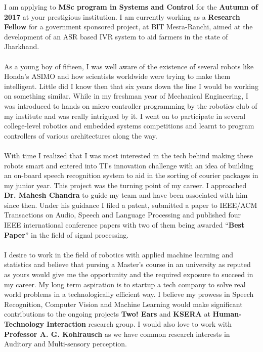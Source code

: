 \documentclass[11pt, a4paper]{awesome-cv}
\begin{document}
\makecvheader

\makelettertitle

\begin{cvletter}
I am applying to \textbf{MSc program in Systems and Control} for the \textbf{Autumn of 2017} at your prestigious institution. I am currently working as a \textbf{Research Fellow} for a government sponsored project, at BIT Mesra-Ranchi, aimed at the development of an ASR based IVR system to aid farmers in the state of Jharkhand.\\ \\
As a young boy of fifteen, I was well aware of the existence of several robots like Honda's ASIMO and how scientists worldwide were trying to make them intelligent. Little did I know then that six years down the line I would be working on something similar. While in my freshman year of Mechanical Engineering, I was introduced to hands on micro-controller programming by the robotics club of my institute and was really intrigued by it. I went on to participate in several college-level robotics and embedded systems competitions and learnt to program controllers of various architectures along the way.\\ \\
With time I realized that I was most interested in the tech behind making these robots smart and entered into TI's innovation challenge with an idea of building an on-board speech recognition system to aid in the sorting of courier packages in my junior year. This project was the turning point of my career. I approached \textbf{Dr. Mahesh Chandra} to guide my team and have been associated with him since then. Under his guidance I filed a patent, submitted a paper to IEEE/ACM Transactions on Audio, Speech and Language Processing and published four IEEE international conference papers with two of them being awarded ``\textbf{Best Paper}'' in the field of signal processing.\\ \\
I desire to work in the field of robotics with applied machine learning and statistics and believe that pursing a Master's course in an university as reputed as yours would give me the opportunity and the required exposure to succeed in my career. My long term aspiration is to startup a tech company to solve real world problems in a technologically efficient way. I believe my prowess in Speech Recognition, Computer Vision and Machine Learning would make significant contributions to the ongoing projects \textbf{Two! Ears} and \textbf{KSERA} at \textbf{Human-Technology Interaction} research group. I would also love to work with \textbf{Professor A. G. Kohlrausch} as we have common research interests in Auditory and Multi-sensory perception.\\ \\

\end{cvletter}
\end{document}

